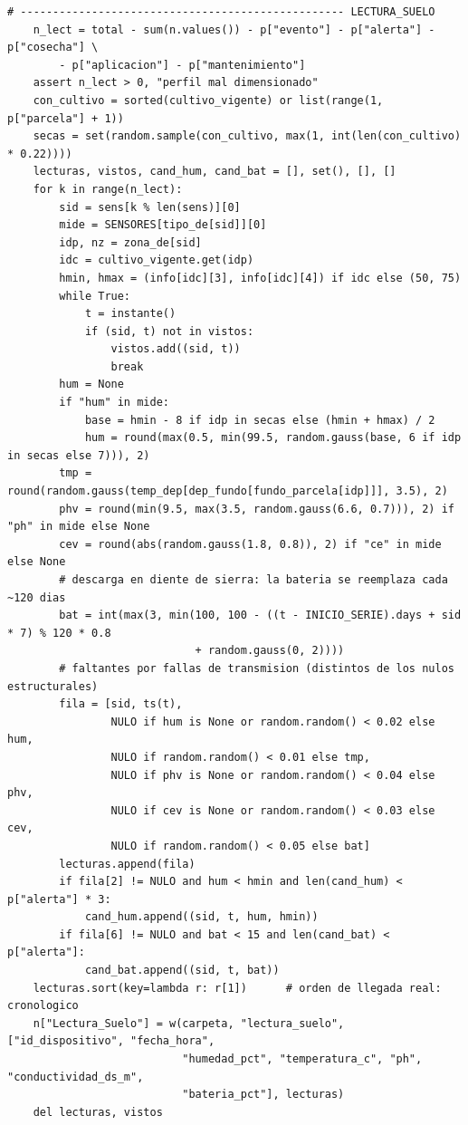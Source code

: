 \documentclass[11pt,letterpaper]{article}
\begin{document}
\begin{lstlisting}[style=py]
    # -------------------------------------------------- LECTURA_SUELO
    n_lect = total - sum(n.values()) - p["evento"] - p["alerta"] - p["cosecha"] \
        - p["aplicacion"] - p["mantenimiento"]
    assert n_lect > 0, "perfil mal dimensionado"
    con_cultivo = sorted(cultivo_vigente) or list(range(1, p["parcela"] + 1))
    secas = set(random.sample(con_cultivo, max(1, int(len(con_cultivo) * 0.22))))
    lecturas, vistos, cand_hum, cand_bat = [], set(), [], []
    for k in range(n_lect):
        sid = sens[k % len(sens)][0]
        mide = SENSORES[tipo_de[sid]][0]
        idp, nz = zona_de[sid]
        idc = cultivo_vigente.get(idp)
        hmin, hmax = (info[idc][3], info[idc][4]) if idc else (50, 75)
        while True:
            t = instante()
            if (sid, t) not in vistos:
                vistos.add((sid, t))
                break
        hum = None
        if "hum" in mide:
            base = hmin - 8 if idp in secas else (hmin + hmax) / 2
            hum = round(max(0.5, min(99.5, random.gauss(base, 6 if idp in secas else 7))), 2)
        tmp = round(random.gauss(temp_dep[dep_fundo[fundo_parcela[idp]]], 3.5), 2)
        phv = round(min(9.5, max(3.5, random.gauss(6.6, 0.7))), 2) if "ph" in mide else None
        cev = round(abs(random.gauss(1.8, 0.8)), 2) if "ce" in mide else None
        # descarga en diente de sierra: la bateria se reemplaza cada ~120 dias
        bat = int(max(3, min(100, 100 - ((t - INICIO_SERIE).days + sid * 7) % 120 * 0.8
                             + random.gauss(0, 2))))
        # faltantes por fallas de transmision (distintos de los nulos estructurales)
        fila = [sid, ts(t),
                NULO if hum is None or random.random() < 0.02 else hum,
                NULO if random.random() < 0.01 else tmp,
                NULO if phv is None or random.random() < 0.04 else phv,
                NULO if cev is None or random.random() < 0.03 else cev,
                NULO if random.random() < 0.05 else bat]
        lecturas.append(fila)
        if fila[2] != NULO and hum < hmin and len(cand_hum) < p["alerta"] * 3:
            cand_hum.append((sid, t, hum, hmin))
        if fila[6] != NULO and bat < 15 and len(cand_bat) < p["alerta"]:
            cand_bat.append((sid, t, bat))
    lecturas.sort(key=lambda r: r[1])      # orden de llegada real: cronologico
    n["Lectura_Suelo"] = w(carpeta, "lectura_suelo", ["id_dispositivo", "fecha_hora",
                           "humedad_pct", "temperatura_c", "ph", "conductividad_ds_m",
                           "bateria_pct"], lecturas)
    del lecturas, vistos


\end{lstlisting}
\end{document}
